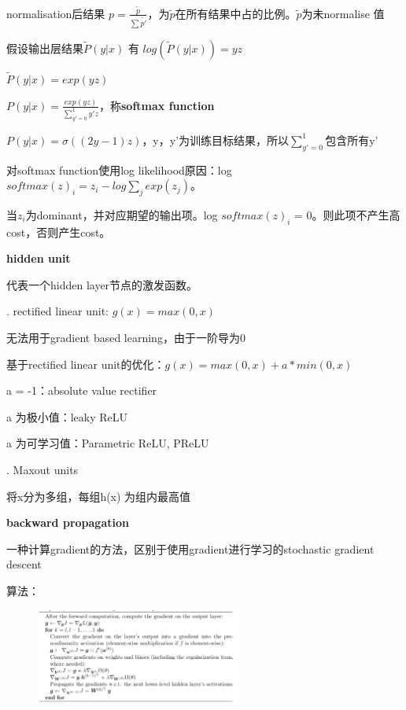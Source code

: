 \documentclass[UTF8]{ctexart}
\begin{document}
  \quad \quad normalisation后结果 $p = \frac{\tilde{p} }{\sum \tilde{p'} } $，为$\tilde{p} $在所有结果中占的比例。$\tilde{p} $为未normalise 值

  \quad 假设输出层结果$\tilde{P} (y | x)$ 有 $log(\tilde{P} (y | x)) = yz$

  \quad \quad $\tilde{P} (y | x) = exp(yz)$

  \quad \quad $P (y | x) = \frac{exp(yz)}{\sum_{y' = 0}^{1} y'z } $，称\textbf{softmax function}

  \quad \quad $P (y | x) = \sigma ((2y - 1)z)$，y，y'为训练目标结果，所以$\sum_{y' = 0}^{1} $包含所有y'

  \quad 对softmax function使用log likelihood原因：log $softmax(z)_i = z_i - log\sum_j exp(z_j)$。

  \quad \quad 当$z_i$为dominant，并对应期望的输出项。log $softmax(z)_i$ = 0。则此项不产生高cost，否则产生cost。

  \textbf{hidden unit}

  \quad \quad 代表一个hidden layer节点的激发函数。

  \quad {}. rectified linear unit: $g(x) = max(0, x)$

  \quad \quad \quad 无法用于gradient based learning，由于一阶导为0

  \quad \quad \quad 基于rectified linear unit的优化：$g(x) = max(0, x) + a*min(0, x)$

  \quad \quad \quad \quad a = -1：absolute value rectifier

  \quad \quad \quad \quad a 为极小值：leaky ReLU

  \quad \quad \quad \quad a 为可学习值：Parametric ReLU, PReLU

  \quad {}. Maxout units

  \quad \quad \quad 将x分为多组，每组h(x) 为组内最高值

  \textbf{backward propagation}

  \quad 一种计算gradient的方法，区别于使用gradient进行学习的stochastic gradient descent

  \quad 算法：
  \begin{figure}[H] %
    \centering %
    \includegraphics[width=0.6\textwidth]{note_images/backprop_algo.png} %
  \end{figure}

  
\end{document}
